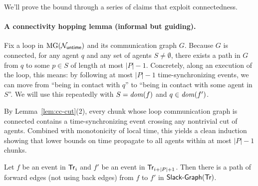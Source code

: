 We'll prove the bound through a series of claims that exploit connectedness.

\paragraph*{A connectivity hopping lemma (informal but guiding).}
Fix a loop in $\operatorname{MG}(\mathcal{N}_{\mathsf{untime}})$ and its communication graph $G$. Because $G$ is connected, for any agent $q$ and any set of agents $S \neq \emptyset$, there exists a path in $G$ from $q$ to some $p \in S$ of length at most $|P|-1$. Concretely, along an execution of the loop, this means: by following at most $|P|-1$ time-synchronizing events, we can move from ``being in contact with $q$'' to ``being in contact with some agent in $S$''.
We will use this repeatedly with $S = \mathit{dom}(f)$ and $q \in \mathit{dom}(f')$.

By Lemma~\ref{lem:cc-cut}(2), every chunk whose loop communication graph is connected contains a time-synchronizing
event crossing any nontrivial cut of agents. Combined with monotonicity of local time, this yields a clean induction
showing that lower bounds on time propagate to all agents within at most $|P|-1$ chunks.

\begin{claim}\label{claim:forward}
Let $f$ be an event in $\textsf{Tr}_i$ and $f'$ be an event in $\textsf{Tr}_{i + |P| + 1}$. Then there is a path of forward edges (not using back edges) from $f$ to $f'$ in $\mathrm{\textsf{Slack-Graph}}(\textsf{Tr})$.
\end{claim}

